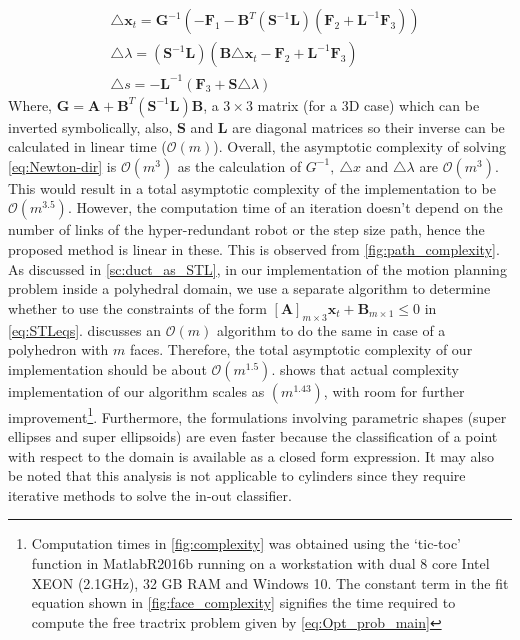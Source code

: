 \documentclass[12pt,a4]{article}
\begin{document}
\begin{align}\label{eq:Newton-dir}
&\triangle \textbf{x}_t=\textbf{G}^{-1}(-\textbf{F}_1-\textbf{B}^T(\textbf{S}^{-1}\textbf{L})(\textbf{F}_2+\textbf{L}^{-1}\textbf{F}_3)) \nonumber \\
&\triangle\lambda=(\textbf{S}^{-1}\textbf{L})(\textbf{B}\triangle \textbf{x}_t -\textbf{F}_2+\textbf{L}^{-1}\textbf{F}_3)\\
&\triangle s = -\textbf{L}^{-1}(\textbf{F}_3+\textbf{S}\triangle \lambda) \nonumber
\end{align}
 Where, $\textbf{G}= \textbf{A}+\textbf{B}^T(\textbf{S}^{-1}\textbf{L})\textbf{B}$, a $3\times3$ matrix (for a 3D case) which can be inverted symbolically, also, $\textbf{S}$ and $\textbf{L}$ are diagonal matrices so their inverse can be calculated in linear time ($\mathcal{O}(m)$). Overall, the asymptotic complexity of solving \cref{eq:Newton-dir} is $\mathcal{O}(m^3)$ as the calculation of $ G^{-1},~ \triangle x$ and $\triangle \lambda$ are $\mathcal{O}(m^3)$. This would result in a total asymptotic complexity of the implementation to be $\mathcal{O}(m^{3.5})$. However, the computation time of an iteration doesn't depend on the number of links of the hyper-redundant robot or the step size path, hence the proposed method is linear in these. This is observed from \cref{fig:path_complexity}. As discussed in \cref{sc:duct_as_STL}, in our implementation of the motion planning problem inside a polyhedral domain, we use a separate algorithm to determine whether to use the constraints of the form $[\mathbf{A}]_{m\times 3}\mathbf{x}_t+\mathbf{B}_{m\times 1}\leq 0$ in \cref{eq:STLeqs}.  discusses an $\mathcal{O}(m)$ algorithm to do the same in case of a polyhedron with $ m $ faces. Therefore, the total asymptotic complexity of our implementation should be about $\mathcal{O}(m^{1.5})$.  shows that actual complexity implementation of our algorithm scales as $(m^{1.43})$, with room for further improvement\footnote{Computation times in \cref{fig:complexity} was obtained using the `tic-toc' function in MatlabR2016b running on a workstation with dual 8 core Intel XEON (2.1GHz), 32 GB RAM and Windows 10. The constant term in the fit equation shown in \cref{fig:face_complexity} signifies the time required to compute the free tractrix problem given by \cref{eq:Opt_prob_main}}. Furthermore, the formulations involving parametric shapes (super ellipses and super ellipsoids) are even faster because the classification of a point with respect to the domain is available as a closed form expression. It may also be noted that this analysis is not applicable to cylinders since they require iterative methods to solve the in-out classifier.
 
\end{document}
